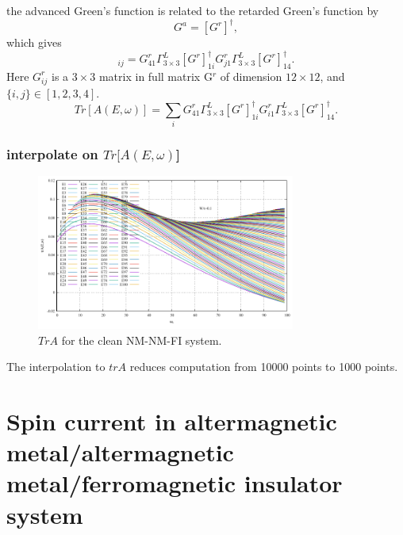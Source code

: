 \documentclass[aps,prb,superscriptaddress]{revtex4-2}
\begin{document}
the advanced Green's function is related to the retarded Green's function by
\begin{equation}
G^{a} = [G^{r}]^{\dag},
\end{equation}
which gives
\begin{equation}
[A(E, \omega)]_{ij} = G_{41}^{r}\Gamma_{3\times3}^{L}[G^{r}]_{1i}^{\dag} G^{r}_{j1}\Gamma_{3\times3}^{L}[G^{r}]_{14}^{\dag}.
\end{equation}
Here $G_{ij}^{r}$ is a $3\times 3$ matrix in full matrix G$^{r}$ of dimension $12\times12$, and $\{i, j\}\in [1,2,3,4]$.
\begin{equation}
Tr[A(E, \omega)] = \sum_{i}G_{41}^{r}\Gamma_{3\times3}^{L}[G^{r}]_{1i}^{\dag} G^{r}_{i1}\Gamma_{3\times3}^{L}[G^{r}]_{14}^{\dag}.
\end{equation}

\subsubsection{interpolate on $Tr[A(E,\omega)$]}

\begin{figure}
\includegraphics[width=8.5cm]{figures/trA.pdf}
\caption{\label{fig:trA} $TrA$ for the clean NM-NM-FI system.}
\end{figure}

The interpolation to $trA$ reduces computation from 10000 points to 1000 points.



\section{Spin current in altermagnetic metal/altermagnetic metal/ferromagnetic insulator system}
\end{document}
